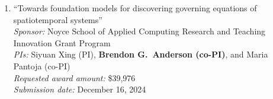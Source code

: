 \begin{grants}
\begin{enumerate}[label={\arabic*.}]
	\textit{Requested award amount:} 12 WTUs worth of summer salary \\
	\textit{Submission date:} January 31, 2025 %
	\item ``Towards foundation models for discovering governing equations of spatiotemporal systems'' \\
	\textit{Sponsor:} Noyce School of Applied Computing Research and Teaching Innovation Grant Program \\
	\textit{PIs:} Siyuan Xing (PI), \textbf{Brendon G.\ Anderson (co-PI)}, and Maria Pantoja (co-PI) \\
	\textit{Requested award amount:} \$39,976 \\
	\textit{Submission date:} December 16, 2024 %
\end{enumerate}

\end{grants}
